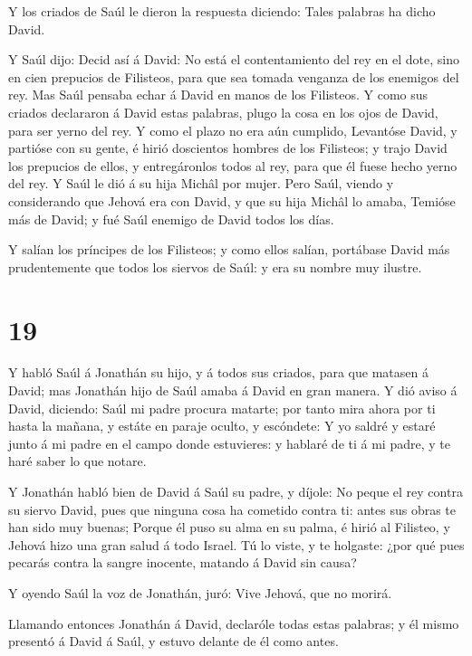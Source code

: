  Y los criados de Saúl le dieron la respuesta diciendo:
Tales palabras ha dicho David.

 Y Saúl dijo: Decid así á David: No está el contentamiento
del rey en el dote, sino en cien prepucios de Filisteos, para que sea
tomada venganza de los enemigos del rey. Mas Saúl pensaba echar á David
en manos de los Filisteos.  Y como sus criados declararon á
David estas palabras, plugo la cosa en los ojos de David, para ser yerno
del rey. Y como el plazo no era aún cumplido,  Levantóse
David, y partióse con su gente, é hirió doscientos hombres de los
Filisteos; y trajo David los prepucios de ellos, y entregáronlos todos
al rey, para que él fuese hecho yerno del rey. Y Saúl le dió á su hija
Michâl por mujer.  Pero Saúl, viendo y considerando que
Jehová era con David, y que su hija Michâl lo amaba, 
Temióse más de David; y fué Saúl enemigo de David todos los días.

 Y salían los príncipes de los Filisteos; y como ellos
salían, portábase David más prudentemente que todos los siervos de Saúl:
y era su nombre muy ilustre.

\hypertarget{section-18}{%
\section{19}\label{section-18}}

 Y habló Saúl á Jonathán su hijo, y á todos sus criados,
para que matasen á David; mas Jonathán hijo de Saúl amaba á David en
gran manera.  Y dió aviso á David, diciendo: Saúl mi padre
procura matarte; por tanto mira ahora por ti hasta la mañana, y estáte
en paraje oculto, y escóndete:  Y yo saldré y estaré junto á
mi padre en el campo donde estuvieres: y hablaré de ti á mi padre, y te
haré saber lo que notare.

 Y Jonathán habló bien de David á Saúl su padre, y díjole:
No peque el rey contra su siervo David, pues que ninguna cosa ha
cometido contra ti: antes sus obras te han sido muy buenas; 
Porque él puso su alma en su palma, é hirió al Filisteo, y Jehová hizo
una gran salud á todo Israel. Tú lo viste, y te holgaste: ¿por qué pues
pecarás contra la sangre inocente, matando á David sin causa?

 Y oyendo Saúl la voz de Jonathán, juró: Vive Jehová, que no
morirá.

 Llamando entonces Jonathán á David, declaróle todas estas
palabras; y él mismo presentó á David á Saúl, y estuvo delante de él
como antes.

